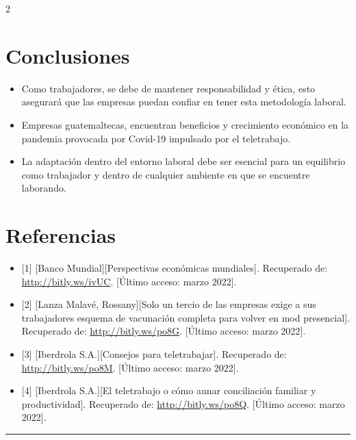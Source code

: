 \documentclass[12pt,spanish,Letterpaper,openany]{book}
\providecommand{\tightlist}{%
  \setlength{\itemsep}{0pt}\setlength{\parskip}{0pt}}
\newcommand{\HRule}{\begin{center}\rule{0.5\linewidth}{0.2mm}\end{center}}
\begin{document}
\begin {multicols}{2}
\hypertarget{conclusiones-7}{%
\section{Conclusiones}\label{conclusiones-7}}

\begin{itemize}
\tightlist
\item
  Como trabajadores, se debe de mantener responsabilidad y ética, esto asegurará que las empresas puedan confiar en tener esta metodología laboral.
\item
  Empresas guatemaltecas, encuentran beneficios y crecimiento económico en la pandemia provocada por Covid-19 impulsado por el teletrabajo.
\item
  La adaptación dentro del entorno laboral debe ser esencial para un equilibrio como trabajador y dentro de cualquier ambiente en que se encuentre laborando.
\end{itemize}

\hypertarget{referencias-11}{%
\section{Referencias}\label{referencias-11}}

\begin{itemize}
\item
  {[}1{]} {[}Banco Mundial{]}{[}Perspectivas económicas mundiales{]}. Recuperado de: \url{http://bitly.ws/ivUC}. {[}Último acceso: marzo 2022{]}.
\item
  {[}2{]} {[}Lanza Malavé, Rossany{]}{[}Solo un tercio de las empresas exige a sus trabajadores esquema de vacunación completa para volver en mod presencial{]}. Recuperado de: \url{http://bitly.ws/po8G}. {[}Último acceso: marzo 2022{]}.
\item
  {[}3{]} {[}Iberdrola S.A.{]}{[}Consejos para teletrabajar{]}. Recuperado de: \url{http://bitly.ws/po8M}. {[}Último acceso: marzo 2022{]}.
\item
  {[}4{]} {[}Iberdrola S.A.{]}{[}El teletrabajo o cómo aunar conciliación familiar y productividad{]}. Recuperado de: \url{http://bitly.ws/po8Q}. {[}Último acceso: marzo 2022{]}.
\end{itemize}

\end {multicols}
\medskip
\HRule
\medskip
\end{document}
